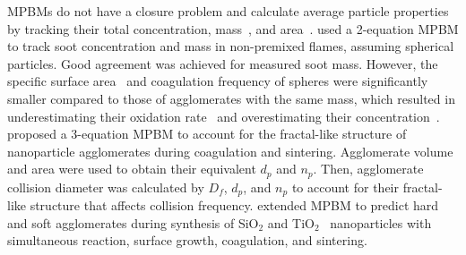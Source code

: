 MPBMs do not have a closure problem and calculate average particle properties by tracking their total concentration, mass~\citep{kruis1993simple}, and area~\citep{tsantilis2004soft, lindstedt1994simplified}. \citet{leung1991simplified} used a 2-equation MPBM to track soot concentration and mass in non-premixed flames, assuming spherical particles. Good agreement was achieved for measured soot mass. However, the specific surface area~\citep{lindstedt1994simplified} and coagulation frequency of spheres were significantly smaller compared to those of agglomerates with the same mass, which resulted in underestimating their oxidation rate~\citep{kelesidis2019estimating} and overestimating their concentration~\citep{kruis1993simple}. \citet{kruis1993simple} proposed a 3-equation MPBM to account for the fractal-like structure of nanoparticle agglomerates during coagulation and sintering. Agglomerate volume and area were used to obtain their equivalent $d_p$ and $n_p$. Then, agglomerate collision diameter was calculated by $D_f$, $d_p$, and $n_p$ to account for their fractal-like structure that affects collision frequency. \citet{tsantilis2004soft} extended MPBM to predict hard and soft agglomerates during synthesis of SiO$_2$ and TiO$_2$~\citep{grass2006design} nanoparticles with simultaneous reaction, surface growth, coagulation, and sintering.


